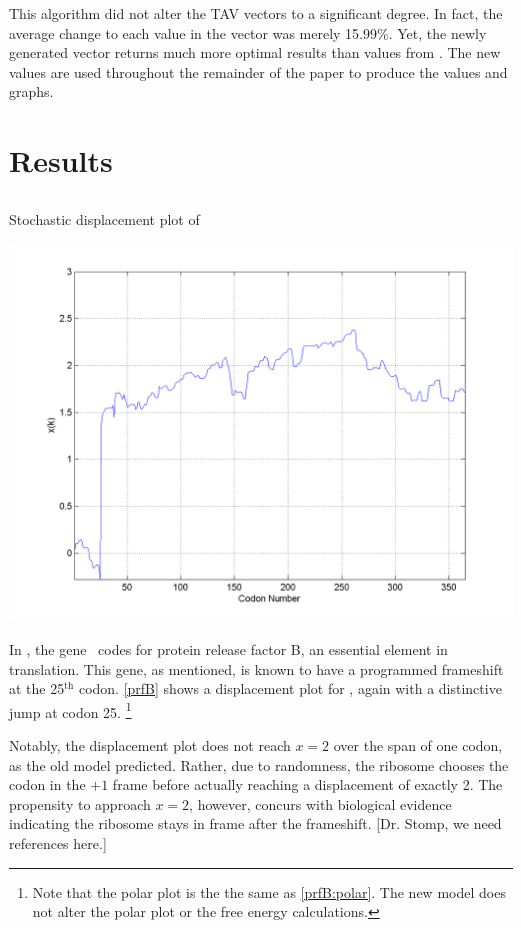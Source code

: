 \documentclass[12pt, draft]{article}
\numberwithin{equation}{section}
\begin{document}
This algorithm did not alter the TAV vectors to a significant degree.
In fact, the average change to each value in the vector was merely
15.99\%.  Yet, the newly generated vector returns much more optimal
results than values from \citeauthor{lalit:embs}.  The new values
are used throughout the remainder of the paper to produce the 
values and graphs.

\section{Results}
\subsection{\prfB}

\begin{cfigure}
  \caption{Stochastic displacement plot of \prfB}
  \label{prfB}
  \includegraphics[scale=0.4]{prfB/disp}
\end{cfigure}

In \ecoli, the gene \prfB\ codes for protein release factor B, an
essential element in translation.  This gene, as mentioned, is known
to have a programmed frameshift at the 25$^{\textrm{th}}$ codon.
\autoref{prfB} shows a displacement plot for
\prfB, again with a distinctive jump at codon 25.
\footnote{Note that the polar plot is the the same as \autoref{prfB:polar}. 
The new model does not alter the polar plot or the free energy calculations.}

Notably, the displacement plot does not reach $x=2$ over the span of
one codon, as the old model predicted.  Rather, due to randomness, the
ribosome chooses the codon in the $+1$ frame before actually reaching
a displacement of exactly 2.  The propensity to approach $x=2$,
however, concurs with biological evidence indicating the ribosome
stays in frame after the frameshift.  [Dr. Stomp, we need references
  here.]
\end{document}
